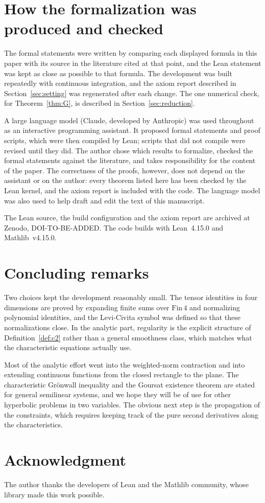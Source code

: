 \documentclass{lmcs}
\begin{document}
\section{How the formalization was produced and checked}\label{sec:methods}

The formal statements were written by comparing each displayed formula in this paper with its source in the literature cited at that point, and the Lean statement was kept as close as possible to that formula. The development was built repeatedly with continuous integration, and the axiom report described in Section~\ref{sec:setting} was regenerated after each change. The one numerical check, for Theorem~\ref{thm:G}, is described in Section~\ref{sec:reduction}.

A large language model (Claude, developed by Anthropic) was used throughout as an interactive programming assistant. It proposed formal statements and proof scripts, which were then compiled by Lean; scripts that did not compile were revised until they did. The author chose which results to formalize, checked the formal statements against the literature, and takes responsibility for the content of the paper. The correctness of the proofs, however, does not depend on the assistant or on the author: every theorem listed here has been checked by the Lean kernel, and the axiom report is included with the code. The language model was also used to help draft and edit the text of this manuscript.

The Lean source, the build configuration and the axiom report are archived at Zenodo, DOI-TO-BE-ADDED. The code builds with Lean~4.15.0 and Mathlib~v4.15.0.

\section{Concluding remarks}\label{sec:conclusion}

Two choices kept the development reasonably small. The tensor identities in four dimensions are proved by expanding finite sums over $\mathrm{Fin}\,4$ and normalizing polynomial identities, and the Levi-Civita symbol was defined so that these normalizations close. In the analytic part, regularity is the explicit structure of Definition~\ref{def:c2} rather than a general smoothness class, which matches what the characteristic equations actually use.

Most of the analytic effort went into the weighted-norm contraction and into extending continuous functions from the closed rectangle to the plane. The characteristic Gr\"onwall inequality and the Goursat existence theorem are stated for general semilinear systems, and we hope they will be of use for other hyperbolic problems in two variables. The obvious next step is the propagation of the constraints, which requires keeping track of the pure second derivatives along the characteristics.

\section*{Acknowledgment}
\noindent The author thanks the developers of Lean and the Mathlib community, whose library made this work possible.



\end{document}
